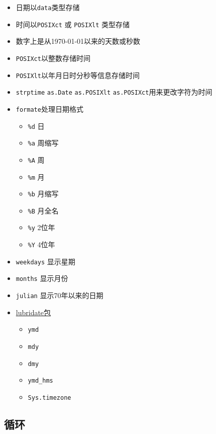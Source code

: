 \documentclass[
]{book}
\providecommand{\tightlist}{%
  \setlength{\itemsep}{0pt}\setlength{\parskip}{0pt}}
\begin{document}
\begin{itemize}
\tightlist
\item
  日期以\texttt{data}类型存储
\item
  时间以\texttt{POSIXct} 或 \texttt{POSIXlt} 类型存储
\item
  数字上是从1970-01-01以来的天数或秒数
\item
  \texttt{POSIXct}以整数存储时间
\item
  \texttt{POSIXlt}以年月日时分秒等信息存储时间
\item
  \texttt{strptime} \texttt{as.Date} \texttt{as.POSIXlt} \texttt{as.POSIXct}用来更改字符为时间
\item
  \texttt{formate}处理日期格式

  \begin{itemize}
  \tightlist
  \item
    \texttt{\%d} 日
  \item
    \texttt{\%a} 周缩写
  \item
    \texttt{\%A} 周
  \item
    \texttt{\%m} 月
  \item
    \texttt{\%b} 月缩写
  \item
    \texttt{\%B} 月全名
  \item
    \texttt{\%y} 2位年
  \item
    \texttt{\%Y} 4位年
  \end{itemize}
\item
  \texttt{weekdays} 显示星期
\item
  \texttt{months} 显示月份
\item
  \texttt{julian} 显示70年以来的日期
\item
  \href{http://cran.r-project.org/web/packages/lubridate/vignettes/lubridate.html}{lubridate包}

  \begin{itemize}
  \tightlist
  \item
    \texttt{ymd}
  \item
    \texttt{mdy}
  \item
    \texttt{dmy}
  \item
    \texttt{ymd\_hms}
  \item
    \texttt{Sys.timezone}
  \end{itemize}
\end{itemize}

\hypertarget{ux5faaux73af}{%
\subsection{循环}\label{ux5faaux73af}}
\end{document}
